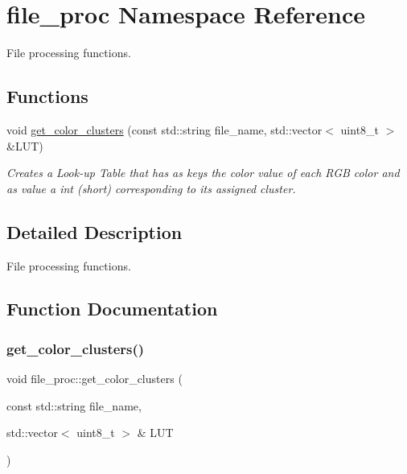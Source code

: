 \hypertarget{namespacefile__proc}{}\section{file\+\_\+proc Namespace Reference}
\label{namespacefile__proc}


File processing functions.  


\subsection*{Functions}
\begin{DoxyCompactItemize}
\item 
void \hyperlink{namespacefile__proc_a93f1e65e57f9161846b265c0b91b51d9}{get\+\_\+color\+\_\+clusters} (const std\+::string file\+\_\+name, std\+::vector$<$ uint8\+\_\+t $>$ \&L\+UT)
\begin{DoxyCompactList}\small\item\em Creates a Look-\/up Table that has as keys the color value of each R\+GB color and as value a int (short) corresponding to its assigned cluster. \end{DoxyCompactList}\end{DoxyCompactItemize}


\subsection{Detailed Description}
File processing functions. 

\subsection{Function Documentation}
\mbox{\label{namespacefile__proc_a93f1e65e57f9161846b265c0b91b51d9}} 
\subsubsection{\texorpdfstring{get\+\_\+color\+\_\+clusters()}{get\_color\_clusters()}}
{\footnotesize\ttfamily void file\+\_\+proc\+::get\+\_\+color\+\_\+clusters (\begin{DoxyParamCaption}\item[{const std\+::string}]{file\+\_\+name,  }\item[{std\+::vector$<$ uint8\+\_\+t $>$ \&}]{L\+UT }\end{DoxyParamCaption})}



